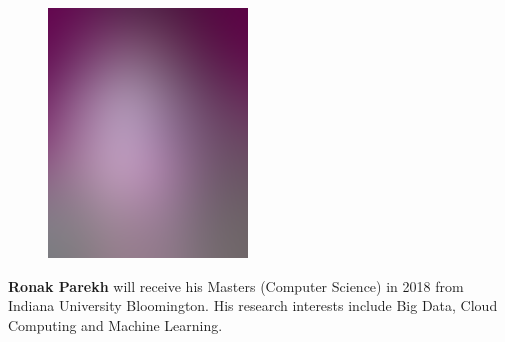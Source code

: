 \documentclass[9pt,twocolumn,twoside]{../../styles/osajnl}
\begin{document}
	\begin{minipage}[t][3.2cm][t]{1.0\columnwidth} %
	  \begin{figure}
	    \includegraphics[width=0.25\columnwidth]{images/alice_smith.eps}
	  \end{figure}
	  \noindent
	  {\bfseries Ronak Parekh} will receive his Masters (Computer
          Science) in 2018 from Indiana University Bloomington. His
          research interests include Big Data, Cloud Computing and
          Machine Learning.
	\end{minipage}
        \endgroup
        
\end{document}

